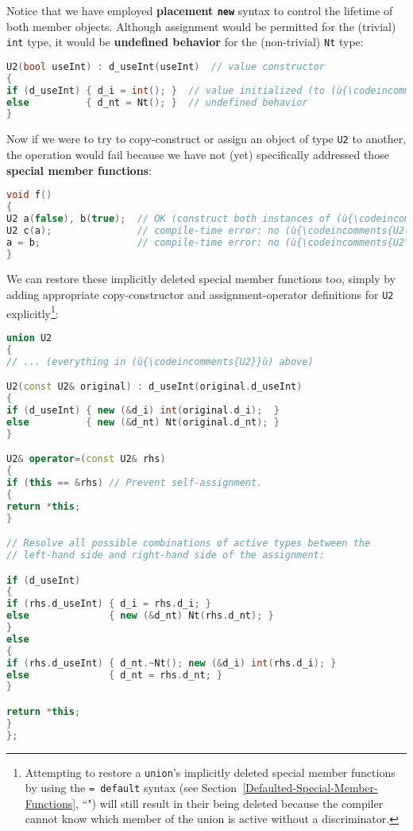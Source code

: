 \noindent Notice that we have employed \textbf{placement \texttt{new}} syntax to
control the lifetime of both member objects. Although assignment would
be permitted for the (trivial) \texttt{int} type, it would be
\textbf{undefined behavior} for the (non-trivial) \texttt{Nt} type:

\begin{lstlisting}[language=C++]
U2(bool useInt) : d_useInt(useInt)  // value constructor
{
if (d_useInt) { d_i = int(); }  // value initialized (to (ù{\codeincomments{0}}ù))
else          { d_nt = Nt(); }  // undefined behavior
}
\end{lstlisting}

\noindent Now if we were to try to copy-construct or assign an object of type
\texttt{U2} to another, the operation would fail because we have not
(yet) specifically addressed those \textbf{special member functions}:

\begin{lstlisting}[language=C++]
void f()
{
U2 a(false), b(true);  // OK (construct both instances of (ù{\codeincomments{U2}}ù))
U2 c(a);               // compile-time error: no (ù{\codeincomments{U2(const U2\&)}}ù)
a = b;                 // compile-time error: no (ù{\codeincomments{U2\& operator=(const U2\&)}}ù)
}
\end{lstlisting}

\noindent We can restore these implicitly deleted special member functions too,
simply by adding appropriate copy-constructor and assignment-operator
definitions for \texttt{U2} explicitly{\cprotect\footnote{Attempting to
restore a \texttt{union}'s implicitly deleted special member
functions by using the \texttt{=}~\texttt{default} syntax (see
Section~\ref{Defaulted-Special-Member-Functions}, ``") will still result in their being deleted because
the compiler cannot know which member of the union is active without a
discriminator.}}:

\begin{lstlisting}[language=C++]
union U2
{
// ... (everything in (ù{\codeincomments{U2}}ù) above)

U2(const U2& original) : d_useInt(original.d_useInt)
{
if (d_useInt) { new (&d_i) int(original.d_i);  }
else          { new (&d_nt) Nt(original.d_nt); }
}

U2& operator=(const U2& rhs)
{
if (this == &rhs) // Prevent self-assignment.
{
return *this;
}

// Resolve all possible combinations of active types between the
// left-hand side and right-hand side of the assignment:

if (d_useInt)
{
if (rhs.d_useInt) { d_i = rhs.d_i; }
else              { new (&d_nt) Nt(rhs.d_nt); }
}
else
{
if (rhs.d_useInt) { d_nt.~Nt(); new (&d_i) int(rhs.d_i); }
else              { d_nt = rhs.d_nt; }
}

return *this;
}
};
\end{lstlisting}


